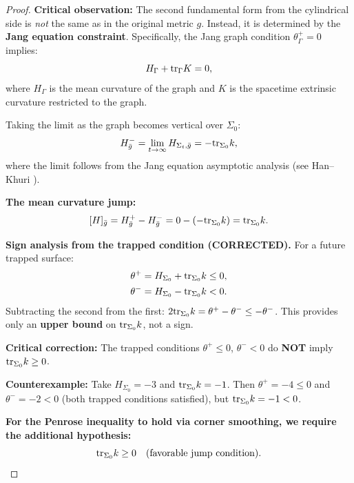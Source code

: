 \begin{proof}
\textbf{Critical observation:} The second fundamental form from the cylindrical side is \emph{not} the same as in the original metric $g$. Instead, it is determined by the \textbf{Jang equation constraint}. Specifically, the Jang graph condition $\theta^+_\Gamma = 0$ implies:
\begin{equation}\label{eq:JangGraphCondition}
    H_\Gamma + \mathrm{tr}_\Gamma K = 0,
\end{equation}
where $H_\Gamma$ is the mean curvature of the graph and $K$ is the spacetime extrinsic curvature restricted to the graph.

Taking the limit as the graph becomes vertical over $\Sigma_0$:
\begin{equation}\label{eq:HminusFromJang}
    H^-_{\bar{g}} = \lim_{t \to \infty} H_{\Sigma_t, \bar{g}} = -\mathrm{tr}_{\Sigma_0} k,
\end{equation}
where the limit follows from the Jang equation asymptotic analysis (see Han--Khuri \cite[Prop.~4.8]{hankhuri2013}).

\textbf{The mean curvature jump:}
\begin{equation}\label{eq:JumpFormula}
    [H]_{\bar{g}} = H^+_{\bar{g}} - H^-_{\bar{g}} = 0 - (-\mathrm{tr}_{\Sigma_0} k) = \mathrm{tr}_{\Sigma_0} k.
\end{equation}

\textbf{Sign analysis from the trapped condition (CORRECTED).} For a future trapped surface:
\begin{align*}
    \theta^+ &= H_{\Sigma_0} + \mathrm{tr}_{\Sigma_0} k \le 0, \\
    \theta^- &= H_{\Sigma_0} - \mathrm{tr}_{\Sigma_0} k < 0.
\end{align*}
Subtracting the second from the first: $2\mathrm{tr}_{\Sigma_0} k = \theta^+ - \theta^- \le -\theta^-$. This provides only an \textbf{upper bound} on $\mathrm{tr}_{\Sigma_0} k$, not a sign.

\textbf{Critical correction:} The trapped conditions $\theta^+ \le 0$, $\theta^- < 0$ do \textbf{NOT} imply $\mathrm{tr}_{\Sigma_0} k \ge 0$. 

\textbf{Counterexample:} Take $H_{\Sigma_0} = -3$ and $\mathrm{tr}_{\Sigma_0} k = -1$. Then $\theta^+ = -4 \le 0$ and $\theta^- = -2 < 0$ (both trapped conditions satisfied), but $\mathrm{tr}_{\Sigma_0} k = -1 < 0$.

\textbf{For the Penrose inequality to hold via corner smoothing, we require the additional hypothesis:}
\begin{equation}\label{eq:FavorableJump}
    \mathrm{tr}_{\Sigma_0} k \ge 0 \quad \text{(favorable jump condition)}.
\end{equation}


\end{proof}
